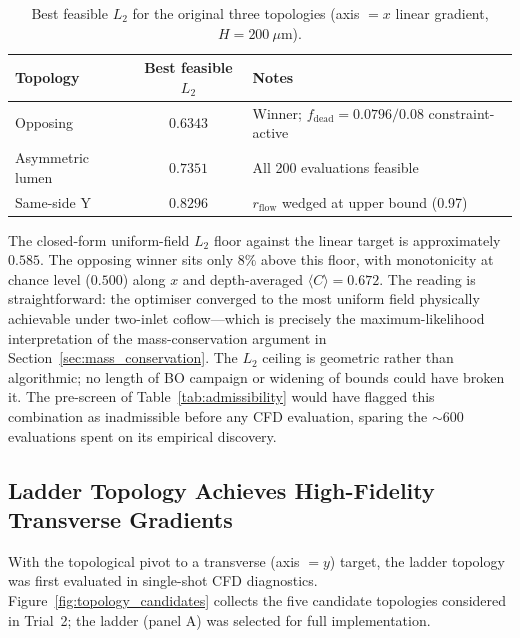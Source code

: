 \documentclass[12pt]{article}
\begin{document}
\begin{table}[H]
\centering
\caption{Best feasible $L_2$ for the original three topologies (axis $= x$ linear gradient, $H = 200~\mu$m).}
\label{tab:original_topologies}
\begin{tabular}{l c l}
\toprule
\textbf{Topology} & \textbf{Best feasible $L_2$} & \textbf{Notes} \\
\midrule
Opposing & $0.6343$ & Winner; $f_{\text{dead}} = 0.0796/0.08$ constraint-active \\
Asymmetric lumen & $0.7351$ & All 200 evaluations feasible \\
Same-side Y & $0.8296$ & $r_{\text{flow}}$ wedged at upper bound (0.97) \\
\bottomrule
\end{tabular}
\end{table}

The closed-form uniform-field $L_2$ floor against the linear target is approximately $0.585$. The opposing winner sits only $8\%$ above this floor, with monotonicity at chance level ($0.500$) along $x$ and depth-averaged $\langle C \rangle = 0.672$. The reading is straightforward: the optimiser converged to the most uniform field physically achievable under two-inlet coflow---which is precisely the maximum-likelihood interpretation of the mass-conservation argument in Section~\ref{sec:mass_conservation}. The $L_2$ ceiling is geometric rather than algorithmic; no length of BO campaign or widening of bounds could have broken it. The pre-screen of Table~\ref{tab:admissibility} would have flagged this combination as inadmissible before any CFD evaluation, sparing the $\sim 600$ evaluations spent on its empirical discovery.

\subsection{Ladder Topology Achieves High-Fidelity Transverse Gradients}
\label{sec:ladder_diagnostic}
With the topological pivot to a transverse (axis $= y$) target, the ladder topology was first evaluated in single-shot CFD diagnostics. Figure~\ref{fig:topology_candidates} collects the five candidate topologies considered in Trial~2; the ladder (panel A) was selected for full implementation.
\end{document}
